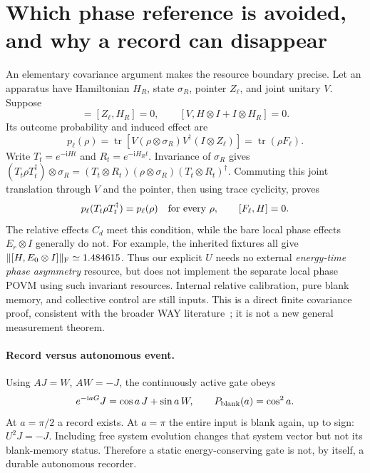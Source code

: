 \documentclass[11pt,a4paper]{article}
\newcommand{\ii}{\mathrm i}
\newcommand{\tr}{\operatorname{tr}}
\begin{document}
\section{Which phase reference is avoided, and why a record can disappear}
An elementary covariance argument makes the resource boundary precise.
Let an apparatus have Hamiltonian $H_R$, state $\sigma_R$, pointer $Z_\ell$,
and joint unitary $V$. Suppose
\begin{equation}
 [\sigma_R,H_R]=[Z_\ell,H_R]=0,\qquad
 [V,H\otimes I+I\otimes H_R]=0.
\end{equation}
Its outcome probability and induced effect are
\begin{equation}
 p_\ell(\rho)=\tr[V(\rho\otimes\sigma_R)V^\dagger(I\otimes Z_\ell)]
             =\tr(\rho F_\ell).
\end{equation}
Write $T_t=e^{-\ii Ht}$ and $R_t=e^{-\ii H_Rt}$. Invariance of
$\sigma_R$ gives
$(T_t\rho T_t^\dagger)\otimes\sigma_R
 =(T_t\otimes R_t)(\rho\otimes\sigma_R)(T_t\otimes R_t)^\dagger$.
Commuting this joint translation through $V$ and the pointer, then
using trace cyclicity, proves
\begin{equation}
 p_\ell(T_t\rho T_t^\dagger)=p_\ell(\rho)\quad\hbox{for every }\rho,
 \qquad [F_\ell,H]=0.\label{reference}
\end{equation}
The relative effects $C_d$ meet this condition, while the bare local
phase effects $E_r\otimes I$ generally do not. For example, the inherited
fixtures all give $\|[H,E_0\otimes I]\|_{\rm F}\simeq1.484615$.
Thus our explicit $U$ needs no external \emph{energy-time phase asymmetry}
resource, but does not implement the separate local phase POVM using
such invariant resources. Internal relative calibration, pure blank
memory, and collective control are still inputs. This is a direct finite
covariance proof, consistent with the broader WAY literature~\cite{way};
it is not a new general measurement theorem.

\paragraph{Record versus autonomous event.}
Using $AJ=W$, $AW=-J$, the continuously active gate obeys
\begin{equation}
 e^{-\ii aG}J=\cos a\,J+\sin a\,W,
 \qquad P_{\rm blank}(a)=\cos^2a.\label{blank}
\end{equation}
At $a=\pi/2$ a record exists. At $a=\pi$ the entire input is blank again,
up to sign: $U^2J=-J$. Including free system evolution changes that
system vector but not its blank-memory status. Therefore a static
energy-conserving gate is not, by itself, a durable autonomous recorder.
\end{document}
